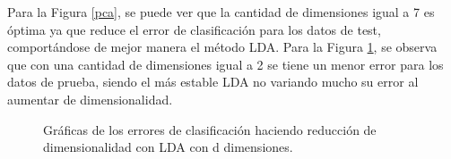 \documentclass[letter, 10pt]{article}
\begin{document}
Para la Figura \ref{pca}, se puede ver que la cantidad de dimensiones igual a 7 es óptima ya que reduce el error de clasificación para los datos de test, comportándose de mejor manera el método LDA. Para la Figura \ref{lda}, se observa que con una cantidad de dimensiones igual a 2 se tiene un menor error para los datos de prueba, siendo el más estable LDA no variando mucho su error al aumentar de dimensionalidad.\\

\begin{figure}[h]
\begin{center}
\caption{Gráficas de los errores de clasificación haciendo reducción de dimensionalidad con LDA con d dimensiones.} 
\label{lda}
\end{center}
\end{figure}
\end{document}
